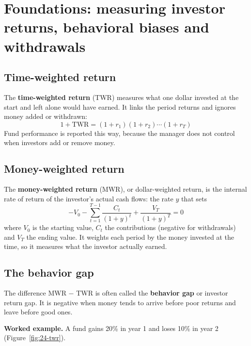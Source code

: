 \section{Foundations: measuring investor returns, behavioral biases and withdrawals}
\label{sec:24-foundations}

\subsection{Time-weighted return}

The \textbf{time-weighted return} (TWR) measures what one dollar invested at the start and left alone would have earned. It links the period returns and ignores money added or withdrawn:
\begin{equation}
  1 + \mathrm{TWR} = (1 + r_1)(1 + r_2)\cdots(1 + r_T)
  \label{eq:24-twr}
\end{equation}
Fund performance is reported this way, because the manager does not control when investors add or remove money.

\subsection{Money-weighted return}

The \textbf{money-weighted return} (MWR), or dollar-weighted return, is the internal rate of return of the investor's actual cash flows: the rate $y$ that sets
\begin{equation}
  -V_0 - \sum_{t=1}^{T-1}\frac{C_t}{(1 + y)^t} + \frac{V_T}{(1 + y)^T} = 0
  \label{eq:24-mwr}
\end{equation}
where $V_0$ is the starting value, $C_t$ the contributions (negative for withdrawals) and $V_T$ the ending value. It weights each period by the money invested at the time, so it measures what the investor actually earned.

\subsection{The behavior gap}

The difference MWR $-$ TWR is often called the \textbf{behavior gap} or investor return gap. It is negative when money tends to arrive before poor returns and leave before good ones.

\textbf{Worked example.} A fund gains 20\% in year 1 and loses 10\% in year 2 (Figure~\ref{fig:24-twr}).

